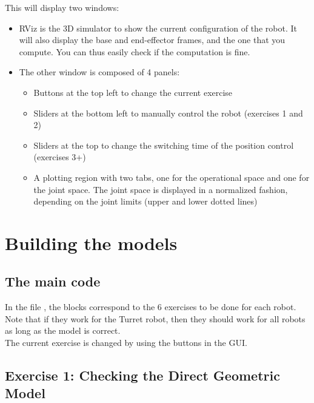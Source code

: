 \documentclass{ecnreport}
\begin{document}
  This will display two windows:
  \begin{itemize}
    \item RViz is the 3D simulator to show the current configuration of the robot. It will also display the base and end-effector frames, and the one that you compute. You can thus easily check if the computation is fine.
    \item The other window is composed of 4 panels:
    \begin{itemize}
      \item Buttons at the top left to change the current exercise
      \item Sliders at the bottom left to manually control the robot (exercises 1 and 2)
      \item Sliders at the top to change the switching time of the position control (exercises 3+)
      \item A plotting region with two tabs, one for the operational space and one for the joint space. The joint space is displayed in a normalized fashion, depending on the joint limits (upper and lower dotted lines)
    \end{itemize}
  \end{itemize}
  
  
  \section{Building the models}
  
  \subsection*{The main code}
  
  In the file , the  blocks correspond to the 6 exercises to be done for each robot. Note that if they work for the Turret robot, then
  they should work for all robots as long as the model is correct. \\
  The current exercise is changed by using the buttons in the GUI.
  
  \subsection*{Exercise 1: Checking the Direct Geometric Model}
  
\end{document}
